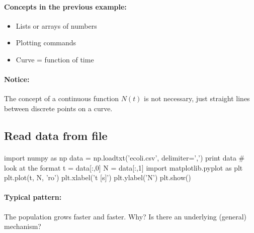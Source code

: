 \documentclass[%
twoside,                 %
final,                   %
10pt]{article}
\begin{document}
\noindent




\paragraph{Concepts in the previous example:}
\begin{itemize}
 \item Lists or arrays of numbers

 \item Plotting commands

 \item Curve = function of time
\end{itemize}

\noindent




\paragraph{Notice:}
The concept of a continuous function $N(t)$ is not necessary,
just straight lines between discrete points on a curve.



\subsection{Read data from file}


\paragraph{}
\bpypro
import numpy as np
data = np.loadtxt('ecoli.csv', delimiter=',')
print data  # look at the format
t = data[:,0]
N = data[:,1]
import matplotlib.pyplot as plt
plt.plot(t, N, 'ro')
plt.xlabel('t [s]')
plt.ylabel('N')
plt.show()
\epypro




\paragraph{Typical pattern:}
The population grows faster and faster. Why? Is there an
underlying (general) mechanism?
\end{document}
